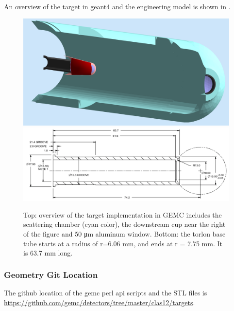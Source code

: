An overview of the target in geant4 and the engineering model is shown in .

\begin{figure}
	\centering
	\includegraphics[width=0.95\columnwidth,keepaspectratio]{img/targetOverview1.png}
	\includegraphics[width=0.95\columnwidth,keepaspectratio]{img/targetOverview2.png}
	\caption{Top: overview of the target implementation in GEMC includes the scattering chamber (cyan color), the
            downstream cup near the right of the figure and 50 μm aluminum window. Bottom: the torlon base
            tube starts at a radius of r=6.06 mm, and ends at r = 7.75 mm. It is 63.7 mm long.}
	\label{fig:targetDesign}
\end{figure}

\subsubsection{Geometry Git Location}
The github location of the gemc perl api scripts and the STL files is \url{https://github.com/gemc/detectors/tree/master/clas12/targets}.





